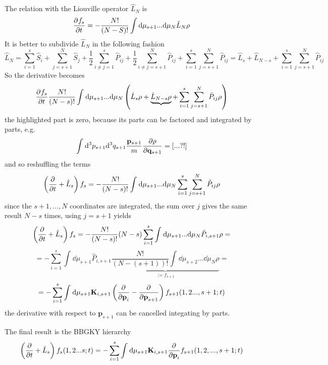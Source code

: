 The relation with the Liouville operator $\hat L_N$ is
$$\pdv[]{f_s}{t} = -\frac{N!}{(N-S)!}\int\dd\mu_{s+1}...\dd\mu_N\hat L_N
\rho$$
It is better to subdivide $\hat L_N$ in the following fashion
$$
\hat L_N = \sum_{i=1}^{s}\hat S_i + \sum_{j=s+1}^{N}\hat S_j + \frac{1}{2}
\sum_{i\neq j=1}^{s}\hat P_{ij} + \frac{1}{2}\sum_{i\neq j=s+1}^{N}\hat P_{ij} +
\sum_{i=1}^{s}\sum_{j=s+1}^{N} \hat P_{ij}=\hat L_s + \hat L_{N-s}+\sum_{i=1}^{s}
\sum_{j=s+1}^{N}\hat P_{ij}
$$
So the derivative becomes
$$\pdv[]{f_s}{t}\frac{N!}{(N-s)!}\int_{}^{}\dd\mu_{s+1}...\dd\mu_N\left(\hat
L_s\rho + \underbrace{\hat L_{N-s}\rho}+\sum_{i=1}^{s}\sum_{j=s+1}^{N}
\hat P_{ij}\rho\right)$$
the highlighted part is zero, because its parts can be factored and integrated
by parts, e.g.
$$\int_{}^{}\dd^3p_{s+1}\dd^3q_{s+1} \frac{\mathbf{p}_{s+1}}{m}
\pdv{\rho}{\mathbf{q}_{s+1}}= [...?!]$$
and so reshuffling the terms
$$\left(\pdv[]{}{t}+\hat L_s\right)f_s = -\frac{N!}{(N-s)!}
\int_{}^{}\dd\mu_{s+1}...\dd\mu_N \sum_{i=1}^{s}\sum_{j=s+1}^{N}\hat P_{ij}\rho$$
since the $s+1,...,N$ coordinates are integrated, the sum over $j$ gives the same
result $N-s$ times, using $j=s+1$ yields
$$\left(\pdv[]{}{t}+\hat L_s\right)f_s = -\frac{N!}{(N-s)!}(N-s)\sum_{i=1}^{s}
\int_{}^{}\dd\mu_{s+1}...\dd\mu_N\hat P_{i,s+1} \rho=$$
$$= -\sum_{i=1}^{s}\int_{}^{}
\dd\mu_{s+1}\hat P_{i,s+1}\underbrace{\frac{N!}{(N-(s+1))!}\int_{}^{}
\dd\mu_{s+2}...\dd\mu_N\rho}_{:=f_{s+1}}=$$
$$=-\sum_{i=1}^{s}\int_{}^{}\dd\mu_{s+1}\mathbf{K}_{i,s+1}\left(
\pdv[]{}{\mathbf{p}_i}-\pdv[]{}{\mathbf{p}_{s+1}}\right)f_{s+1}(1,2...,s+1;t)$$
the derivative with respect to $\mathbf{p}_{s+1}$ can be cancelled integating
by parts.

The final result is the BBGKY hierarchy
$$\left(\pdv{}{t}+\hat L_s\right)f_s(1,2...s;t) = -\sum_{i=1}^{s}\int_{}^{}
\dd\mu_{s+1}\mathbf{K}_{i,s+1}\pdv[]{}{\mathbf{p}_i}f_{s+1}(1,2,...,s+1;t)$$
